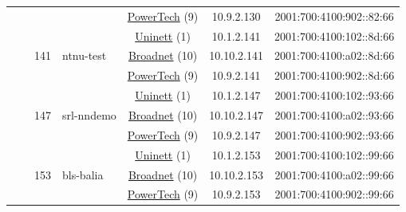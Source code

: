 \begin{small}
\begin{center}
\begin{longtable}{|c|c|c|c|c|c|c|c|}
  &  &  &  & \multicolumn{2}{|c|}{\tiny{\href{http://www.powertech.no}{PowerTech} (9)}} & \tiny{10.9.2.130} & \tiny{2001:700:4100:902::82:66} \\* \cline{3-3}\cline{4-4}\cline{5-5}\cline{6-6}\cline{7-7}\cline{8-8}
  &  & \multirow{3}{*}{\tiny{141}} & \multicolumn{1}{|l|}{\multirow{3}{*}{\tiny{ntnu-test}}} & \multicolumn{2}{|c|}{\tiny{\href{https://www.uninett.no}{Uninett} (1)}} & \tiny{10.1.2.141} & \tiny{2001:700:4100:102::8d:66} \\* \cline{5-5}\cline{6-6}\cline{7-7}\cline{8-8}
  &  &  &  & \multicolumn{2}{|c|}{\tiny{\href{https://www.broadnet.no}{Broadnet} (10)}} & \tiny{10.10.2.141} & \tiny{2001:700:4100:a02::8d:66} \\* \cline{5-5}\cline{6-6}\cline{7-7}\cline{8-8}
  &  &  &  & \multicolumn{2}{|c|}{\tiny{\href{http://www.powertech.no}{PowerTech} (9)}} & \tiny{10.9.2.141} & \tiny{2001:700:4100:902::8d:66} \\* \cline{3-3}\cline{4-4}\cline{5-5}\cline{6-6}\cline{7-7}\cline{8-8}
  &  & \multirow{3}{*}{\tiny{147}} & \multicolumn{1}{|l|}{\multirow{3}{*}{\tiny{srl-nndemo}}} & \multicolumn{2}{|c|}{\tiny{\href{https://www.uninett.no}{Uninett} (1)}} & \tiny{10.1.2.147} & \tiny{2001:700:4100:102::93:66} \\* \cline{5-5}\cline{6-6}\cline{7-7}\cline{8-8}
  &  &  &  & \multicolumn{2}{|c|}{\tiny{\href{https://www.broadnet.no}{Broadnet} (10)}} & \tiny{10.10.2.147} & \tiny{2001:700:4100:a02::93:66} \\* \cline{5-5}\cline{6-6}\cline{7-7}\cline{8-8}
  &  &  &  & \multicolumn{2}{|c|}{\tiny{\href{http://www.powertech.no}{PowerTech} (9)}} & \tiny{10.9.2.147} & \tiny{2001:700:4100:902::93:66} \\* \cline{3-3}\cline{4-4}\cline{5-5}\cline{6-6}\cline{7-7}\cline{8-8}
  &  & \multirow{3}{*}{\tiny{153}} & \multicolumn{1}{|l|}{\multirow{3}{*}{\tiny{bls-balia}}} & \multicolumn{2}{|c|}{\tiny{\href{https://www.uninett.no}{Uninett} (1)}} & \tiny{10.1.2.153} & \tiny{2001:700:4100:102::99:66} \\* \cline{5-5}\cline{6-6}\cline{7-7}\cline{8-8}
  &  &  &  & \multicolumn{2}{|c|}{\tiny{\href{https://www.broadnet.no}{Broadnet} (10)}} & \tiny{10.10.2.153} & \tiny{2001:700:4100:a02::99:66} \\* \cline{5-5}\cline{6-6}\cline{7-7}\cline{8-8}
  &  &  &  & \multicolumn{2}{|c|}{\tiny{\href{http://www.powertech.no}{PowerTech} (9)}} & \tiny{10.9.2.153} & \tiny{2001:700:4100:902::99:66} \\* \cline{3-3}\cline{4-4}\cline{5-5}\cline{6-6}\cline{7-7}\cline{8-8}

\end{longtable}
\end{center}
\end{small}
